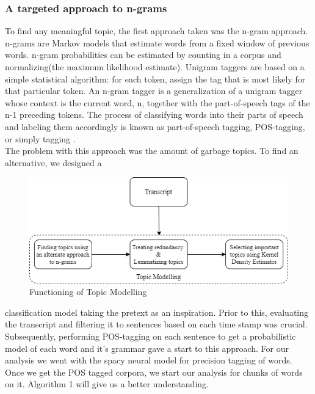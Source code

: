 \documentclass[conference]{IEEEtran}
\begin{document}
\subsubsection{\textbf{A targeted approach to n-grams}}
To find any meaningful topic, the first approach taken was the n-gram approach. n-grams are Markov models that estimate words from a fixed window of previous words. n-gram probabilities can be estimated by counting in a corpus and normalizing(the maximum likelihood estimate). \cite{b5} Unigram taggers are based on a simple statistical algorithm: for each token, assign the tag that is most likely for that particular token. An n-gram tagger is a generalization of a unigram tagger whose context is the current word, n, together with the part-of-speech tags of the n-1 preceding tokens. The process of classifying words into their parts of speech and labeling them accordingly is known as part-of-speech tagging, POS-tagging, or simply tagging \cite{b6}.\\
\indent The problem with this approach was the amount of garbage topics. To find an alternative, we designed a 
\begin{figure}[h]
  \includegraphics[width=\linewidth]{image1.png}
  \caption{Functioning of Topic Modelling}
  \label{fig:Topic Modelling}
\end{figure}

classification model taking the pretext as an inspiration. Prior to this, evaluating the transcript and filtering it to sentences based on each time stamp was crucial. Subsequently, performing POS-tagging on each sentence to get a probabilistic model of each word and it’s grammar gave a start to this approach. For our analysis we went with the spacy\cite{b4} neural model for precision tagging of words. Once we get the POS tagged corpora, we start our analysis for chunks of words on it. Algorithm 1 will give us a better understanding.
\end{document}
